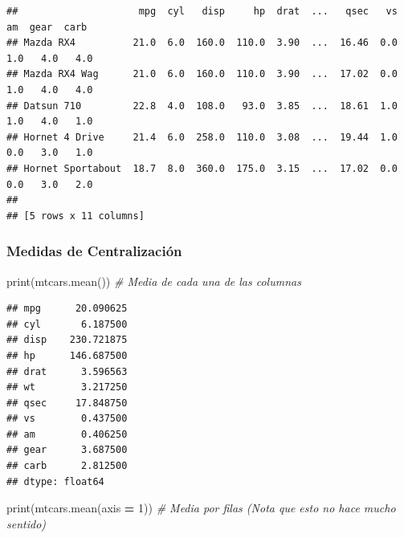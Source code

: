 \documentclass[
]{article}
\newenvironment{Shaded}{\begin{snugshade}}{\end{snugshade}}
\newcommand{\BuiltInTok}[1]{#1}
\newcommand{\CommentTok}[1]{\textcolor[rgb]{0.56,0.35,0.01}{\textit{#1}}}
\newcommand{\DecValTok}[1]{\textcolor[rgb]{0.00,0.00,0.81}{#1}}
\newcommand{\NormalTok}[1]{#1}
\newcommand{\OperatorTok}[1]{\textcolor[rgb]{0.81,0.36,0.00}{\textbf{#1}}}
\begin{document}
\begin{verbatim}
##                     mpg  cyl   disp     hp  drat  ...   qsec   vs   am  gear  carb
## Mazda RX4          21.0  6.0  160.0  110.0  3.90  ...  16.46  0.0  1.0   4.0   4.0
## Mazda RX4 Wag      21.0  6.0  160.0  110.0  3.90  ...  17.02  0.0  1.0   4.0   4.0
## Datsun 710         22.8  4.0  108.0   93.0  3.85  ...  18.61  1.0  1.0   4.0   1.0
## Hornet 4 Drive     21.4  6.0  258.0  110.0  3.08  ...  19.44  1.0  0.0   3.0   1.0
## Hornet Sportabout  18.7  8.0  360.0  175.0  3.15  ...  17.02  0.0  0.0   3.0   2.0
## 
## [5 rows x 11 columns]
\end{verbatim}

\hypertarget{medidas-de-centralizaciuxf3n}{%
\subsubsection{Medidas de
Centralización}\label{medidas-de-centralizaciuxf3n}}

\begin{Shaded}
\begin{Highlighting}[]
\BuiltInTok{print}\NormalTok{(mtcars.mean())    }\CommentTok{\# Media de cada una de las columnas}
\end{Highlighting}
\end{Shaded}

\begin{verbatim}
## mpg      20.090625
## cyl       6.187500
## disp    230.721875
## hp      146.687500
## drat      3.596563
## wt        3.217250
## qsec     17.848750
## vs        0.437500
## am        0.406250
## gear      3.687500
## carb      2.812500
## dtype: float64
\end{verbatim}

\begin{Shaded}
\begin{Highlighting}[]
\BuiltInTok{print}\NormalTok{(mtcars.mean(axis }\OperatorTok{=} \DecValTok{1}\NormalTok{))  }\CommentTok{\# Media por filas (Nota que esto no hace mucho sentido)}
\end{Highlighting}
\end{Shaded}
\end{document}

